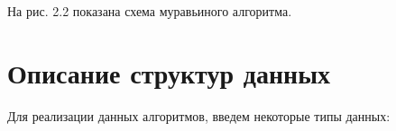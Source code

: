 \documentclass[12pt,a4paper]{report}
\begin{document}
\newpage
На рис. 2.2 показана схема муравьиного алгоритма.

\begin{figure}[ht!]
\end{figure}






\newpage
\section{Описание структур данных}

Для реализации данных алгоритмов, введем некоторые типы данных:
\end{document}
